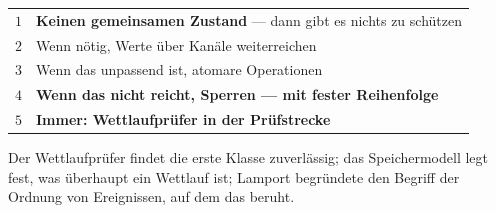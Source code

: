 \begin{aufgabe}
\begin{warnung}
\begin{center}
\renewcommand{\arraystretch}{1.5}
\begin{tabular}{@{}P{1.0cm}P{7.6cm}@{}}
\toprule
$1$ & \textbf{Keinen gemeinsamen Zustand} --- dann gibt es nichts zu schützen\\
$2$ & Wenn nötig, Werte über Kanäle weiterreichen\\
$3$ & Wenn das unpassend ist, atomare Operationen\\
$4$ & \textbf{Wenn das nicht reicht, Sperren --- mit fester Reihenfolge}\\
$5$ & \textbf{Immer: Wettlaufprüfer in der Prüfstrecke}\\
\bottomrule
\end{tabular}
\end{center}

\begin{center}
\begin{minipage}{0.88\textwidth}
\end{minipage}
\end{center}
\end{warnung}
\end{aufgabe}
\vspace{-4pt}
\noindent Der Wett\-lauf\-prü\-fer findet die erste Klasse zu\-ver\-läs\-sig; das Spei\-cher\-mo\-dell legt fest, was über\-haupt ein Wett\-lauf ist; Lamport begründete den Begriff der Ord\-nung von Er\-eig\-nis\-sen, auf dem das beruht.
